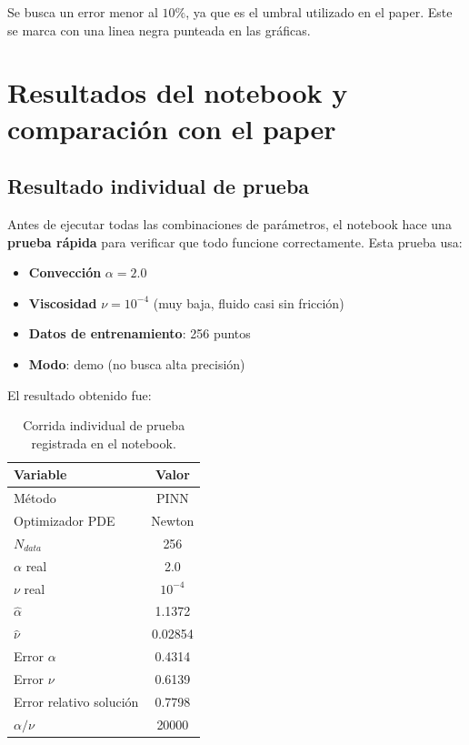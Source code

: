 \documentclass[10pt,letterpaper,twocolumn]{article}
\begin{document}
Se busca un error menor al $10\%$, ya que es el umbral utilizado en el paper. Este se marca con una linea negra punteada en las gráficas.

\section{Resultados del notebook y comparación con el paper}

\subsection{Resultado individual de prueba}

Antes de ejecutar todas las combinaciones de parámetros, el notebook hace una \textbf{prueba rápida} para verificar que todo funcione correctamente. Esta prueba usa:

\begin{itemize}[leftmargin=*]
    \item \textbf{Convección} $ \alpha = 2.0 $
    \item \textbf{Viscosidad} $\nu = 10^{-4}$ (muy baja, fluido casi sin fricción)
    \item \textbf{Datos de entrenamiento}: 256 puntos 
    \item \textbf{Modo}: demo (no busca alta precisión)
\end{itemize}

El resultado obtenido fue:

\begin{table}[H]
\centering
\caption{Corrida individual de prueba registrada en el notebook.}
\begin{tabular}{lc}
\toprule
Variable & Valor \\
\midrule
Método & PINN \\
Optimizador PDE & Newton \\
$N_{data}$ & 256 \\
$\alpha$ real & 2.0 \\
$\nu$ real & $10^{-4}$ \\
$\widehat{\alpha}$ & 1.1372 \\
$\widehat{\nu}$ & 0.02854 \\
Error $\alpha$ & 0.4314 \\
Error $\nu$ & 0.6139 \\
Error relativo solución & 0.7798 \\
$\alpha/\nu$ & 20000 \\
\bottomrule
\end{tabular}
\end{table}
\end{document}
